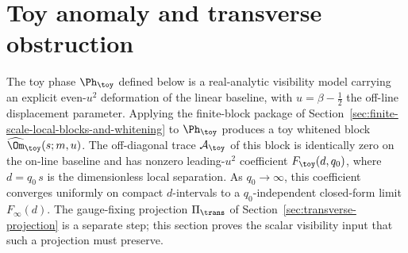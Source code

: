 %
%

\section{Toy anomaly and transverse obstruction}
\label{sec:toy-anomaly-and-transverse-obstruction}
\quad
{}\quad
{}\quad
{}\quad
{}\quad
{}
\par\medskip

The toy phase \(\Ph_\toy\) defined below is a real-analytic visibility
model carrying an explicit even-\(u^2\) deformation of the linear
baseline, with \(u=\beta-\tfrac12\) the off-line displacement parameter.
Applying the finite-block package of
Section~\ref{sec:finite-scale-local-blocks-and-whitening} to
\(\Ph_\toy\) produces a toy whitened block
\(\widehat\Om_\toy(s;m,u)\).  The off-diagonal trace
\(\mathcal A_\toy\) of this block is identically zero on the on-line
baseline and has nonzero leading-\(u^2\) coefficient
\(F_\toy(d,q_0)\), where \(d=q_0\,s\) is the dimensionless local
separation.  As \(q_0\to\infty\), this coefficient converges uniformly
on compact \(d\)-intervals to a \(q_0\)-independent closed-form limit
\(F_{\infty}(d)\).  The gauge-fixing projection
\(\Pi_\trans\) of Section~\ref{sec:transverse-projection} is a separate
step; this section proves the scalar visibility input that such a
projection must preserve.

